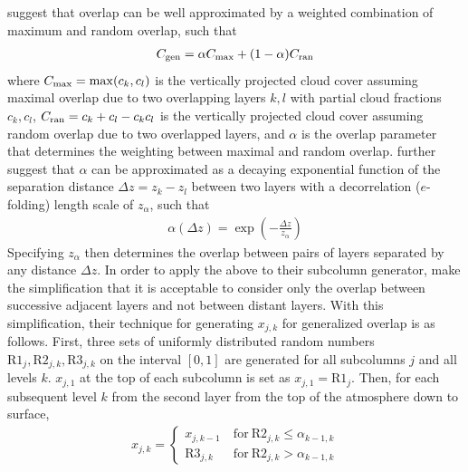 \documentclass[letter]{article}
\begin{document}
\cite{hogan_and_illingworth_2000} suggest that overlap can be well approximated by a weighted combination of maximum and random overlap, such that 
\begin{gather}
    C_{\rm gen} = \alpha C_{\rm max} + (1 - \alpha) C_{\rm ran}
    \label{generalized_overlap}
\end{gather}
where $C_{\rm max} = \max(c_k,c_l)$ is the vertically projected cloud cover assuming maximal overlap due to two overlapping layers $k,l$ with partial cloud fractions $c_k,c_l$, $C_{\rm ran} = c_k + c_l - c_k c_l$ is the vertically projected cloud cover assuming random overlap due to two overlapped layers, and $\alpha$ is the overlap parameter that determines the weighting between maximal and random overlap. \cite{hogan_and_illingworth_2000} further suggest that $\alpha$ can be approximated as a decaying exponential function of the separation distance $\Delta z = z_k - z_l$ between two layers with a decorrelation ($e$-folding) length scale of $z_{\alpha}$, such that
\begin{gather}
    \alpha(\Delta z) = \exp\left(-\frac{\Delta z}{z_{\alpha}}\right)
    \label{alpha_z}
\end{gather}
Specifying $z_{\alpha}$ then determines the overlap between pairs of layers separated by any distance $\Delta z$. In order to apply the above to their subcolumn generator, \cite{raisanen_et_al_2004} make the simplification that it is acceptable to consider only the overlap between successive adjacent layers and not between distant layers. With this simplification, their technique for generating $x_{j,k}$ for generalized overlap is as follows. First, three sets of uniformly distributed random numbers $\text{R1}_{j},\text{R2}_{j,k},\text{R3}_{j,k}$ on the interval $[0,1]$ are generated for all subcolumns $j$ and all levels $k$. $x_{j,1}$ at the top of each subcolumn is set as $x_{j,1} = \text{R1}_{j}$. Then, for each subsequent level $k$ from the second layer from the top of the atmosphere down to surface,
\begin{gather}
    x_{j,k} = \begin{cases}
        x_{j,k-1} & ~\text{for}~\text{R2}_{j,k} \le \alpha_{k-1,k} \\
        \text{R3}_{j,k} & ~\text{for}~\text{R2}_{j,k} > \alpha_{k-1,k}
    \end{cases}
\end{gather}
\end{document}
